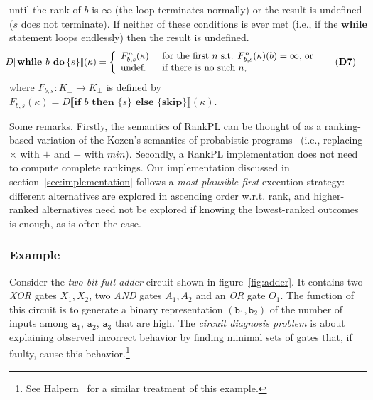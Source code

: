 \documentclass{llncs}
\newcommand{\dn}[1]{D\llbracket #1 \rrbracket}
\begin{document}
		until the rank of $b$ is $\infty$ (the loop terminates normally) or the result is undefined ($s$ does not terminate).
	If neither of these conditions is ever met (i.e., if the $\textbf{while}$ statement loops endlessly) then the result is undefined.
\begin{align}
\hspace{-5pt}\dn{\textbf{while }b\textbf{ do }\hspace{-2pt}\{ s \}}(\kappa) &=
		\left\{
			\begin{array}{ll}
				F_{b,s}^{n}(\kappa)	\hspace{4pt}	& \mbox{for the first }n\mbox{ s.t. }F_{b,s}^{n}(\kappa)(b) = \infty \mbox{, or }\\
				\mbox{undef.}		& \mbox{if there is no such }n,
			\end{array}\hspace{-5pt}\tag{\textbf{D7}}
		\right.
\end{align}
where $F_{b,s}: K_{\bot} \rightarrow K_{\bot}$ is defined by $F_{b,s}(\kappa) = \dn{\textbf{if }b\textbf{ then }\{ s \}\textbf{ else } \{ \textbf{skip} \}}(\kappa)$.

Some remarks.
Firstly, the semantics of RankPL can be thought of as a ranking-based variation of the 
	Kozen's semantics of probabistic programs~\cite{DBLP:journals/jcss/Kozen81} (i.e., replacing $\times$ with $+$ and $+$ with $min$).
Secondly, a RankPL implementation does not need to compute complete rankings.
Our implementation discussed in section~\ref{sec:implementation} follows a \emph{most-plausible-first} execution strategy:
	different alternatives are explored in ascending order w.r.t. rank,
	and higher-ranked alternatives need not be explored if knowing the lowest-ranked outcomes is enough, 
	as is often the case.

\subsubsection{Example}

Consider the \emph{two-bit full adder} circuit shown in figure~\ref{fig:adder}.
It contains two \emph{XOR} gates $X_1, X_2$, two \emph{AND} gates $A_1, A_2$ and an \emph{OR} gate $O_1$.
The function of this circuit is to generate a binary representation $(\texttt{b}_1,\texttt{b}_2)$ 
	of the number of inputs among $\texttt{a}_1$, $\texttt{a}_2$, $\texttt{a}_3$ that are high.
The \emph{circuit diagnosis problem} is about explaining observed incorrect behavior by finding minimal sets of gates that, if faulty, cause this behavior.\footnote{See Halpern~\cite[Chapter~9]{DBLP:books/daglib/0014219} for a similar treatment of this example.}
\end{document}
